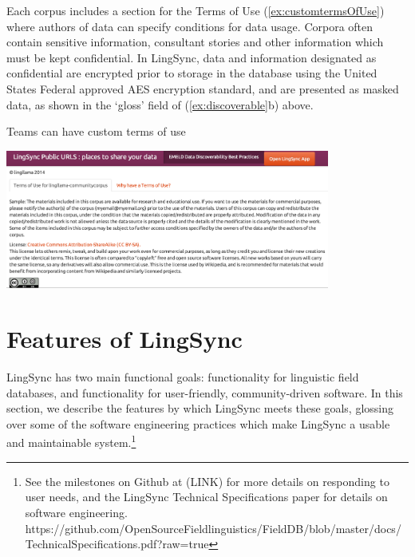 \documentclass[letterpaper, 12pt, dvips]{mitwpl}
\begin{document}
Each corpus includes a section for the Terms of Use (\ref{ex:customtermsOfUse}) where authors of data can specify conditions for data usage. 
Corpora often contain sensitive information, consultant stories and other information which must be kept confidential. 
In LingSync, data and information designated as confidential are encrypted prior to storage in the database using the United States Federal approved AES encryption standard, and are presented as masked data, as shown in the `gloss' field of (\ref{ex:discoverable}b) above. 



\begin{exe} 
\ex Teams can have custom terms of use

 \centering
   \includegraphics[width=0.8\textwidth]{customtermsOfUse}

\label{ex:customtermsOfUse}
\end{exe}






\section{Features of LingSync}
\label{sec:what}

LingSync has two main functional goals: functionality for linguistic field databases, 
and functionality for user-friendly, community-driven software.
In this section, we describe the features by which LingSync meets these goals, glossing over some of the software engineering practices which make LingSync a usable and maintainable system.\footnote{See the milestones on Github at (LINK) for more details on responding to user needs, and the LingSync Technical Specifications paper for details on software engineering. \\ https://github.com/OpenSourceFieldlinguistics/FieldDB/blob/master/docs/TechnicalSpecifications.pdf?raw=true } 
\end{document}
